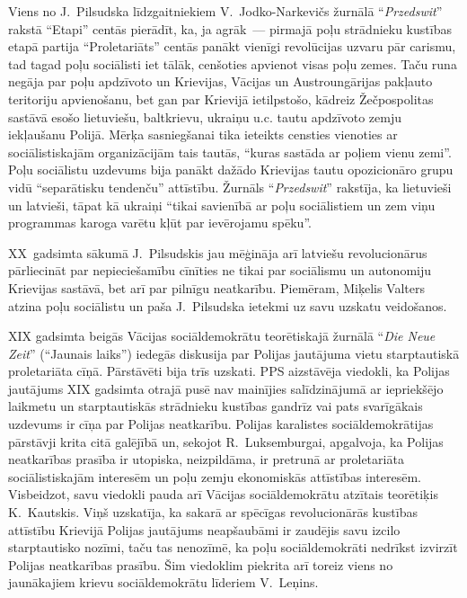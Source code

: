 \documentclass[twoside,a5paper,12pt,fleqn,openany]{extbook}
\newcommand{\pltxti}[1]{\textit{\textpolish{#1}}}
\newcommand{\detxti}[1]{\textit{\textgerman{#1}}}
\begin{document}
Viens no J.~Pilsudska līdzgaitniekiem V.~Jodko-Narkevičs žurnālā ``\pltxti{Przedswit}'' rakstā ``Etapi'' centās pierādīt, ka, ja agrāk~--- pirmajā poļu strādnieku kustības etapā partija ``Proletariāts'' centās panākt vienīgi revolūcijas uzvaru pār carismu, tad tagad poļu sociālisti iet tālāk, cenšoties apvienot visas poļu zemes. Taču runa negāja par poļu apdzīvoto un Krievijas, Vācijas un Austroungārijas pakļauto teritoriju apvienošanu, bet gan par Krievijā ietilpstošo, kādreiz Žečpospolitas sastāvā esošo lietuviešu, baltkrievu, ukraiņu u.c. tautu apdzīvoto zemju iekļaušanu Polijā. Mērķa sasniegšanai tika ieteikts censties vienoties ar sociālistiskajām organizācijām tais tautās, ``kuras sastāda ar poļiem vienu zemi''. Poļu sociālistu uzdevums bija panākt dažādo Krievijas tautu opozicionāro grupu vidū ``separātisku tendenču'' attīstību. Žurnāls ``\pltxti{Przedswit}'' rakstīja, ka lietuvieši un latvieši, tāpat kā ukraiņi ``tikai savienībā ar poļu sociālistiem un zem viņu programmas karoga varētu kļūt par ievērojamu spēku''.

XX~gadsimta sākumā J.~Pilsudskis jau mēģināja arī latviešu revolucionārus pārliecināt par nepieciešamību cīnīties ne tikai par sociālismu un autonomiju Krievijas sastāvā, bet arī par pilnīgu neatkarību. Piemēram, Miķelis Valters atzina poļu sociālistu un paša J.~Pilsudska ietekmi uz savu uzskatu veidošanos.

XIX gadsimta beigās Vācijas sociāldemokrātu teorētiskajā žurnālā ``\detxti{Die Neue Zeit}'' (``Jaunais laiks'') iedegās diskusija par Polijas jautājuma vietu starptautiskā proletariāta cīņā. Pārstāvēti bija trīs uzskati. PPS aizstāvēja viedokli, ka Polijas jautājums XIX gadsimta otrajā pusē nav mainījies salīdzinājumā ar iepriekšējo laikmetu un starptautiskās strādnieku kustības gandrīz vai pats svarīgākais uzdevums ir cīņa par Polijas neatkarību. Polijas karalistes sociāldemokrātijas pārstāvji krita citā galējībā un, sekojot R.~Luksemburgai, apgalvoja, ka Polijas neatkarības prasība ir utopiska, neizpildāma, ir pretrunā ar proletariāta sociālistiskajām interesēm un poļu zemju ekonomiskās attīstības interesēm. Visbeidzot, savu viedokli pauda arī Vācijas sociāldemokrātu atzītais teorētiķis K.~Kautskis. Viņš uzskatīja, ka sakarā ar spēcīgas revolucionārās kustības attīstību Krievijā Polijas jautājums neapšaubāmi ir zaudējis savu izcilo starptautisko nozīmi, taču tas nenozīmē, ka poļu sociāldemokrāti nedrīkst izvirzīt Polijas neatkarības prasību. Šim viedoklim piekrita arī toreiz viens no jaunākajiem krievu sociāldemokrātu līderiem V.~Leņins.
\end{document}
